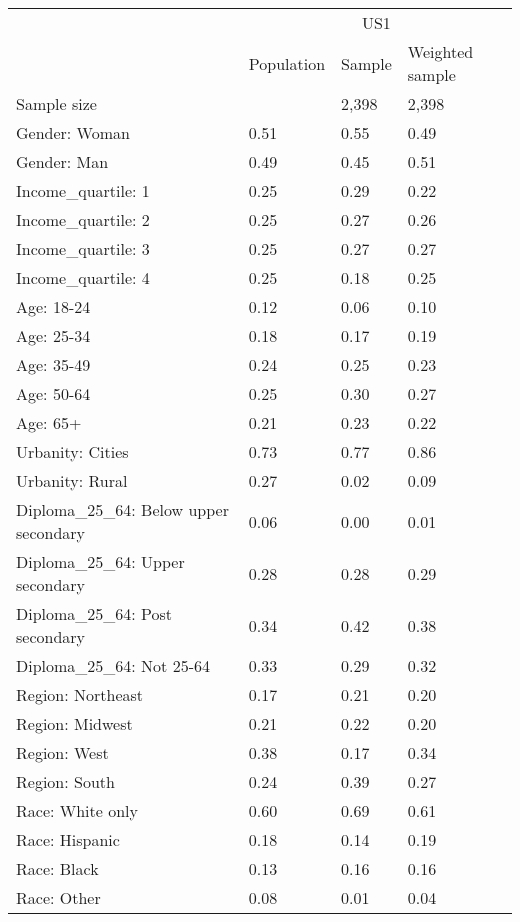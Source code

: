 
\begin{tabular}[t]{llll}
\toprule
\multicolumn{1}{c}{} & \multicolumn{3}{c}{US1} \\
\cmidrule(l{3pt}r{3pt}){2-4}
  & Population & Sample & Weighted sample\\
\midrule
Sample size &  & 2,398 & 2,398\\
\addlinespace
Gender: Woman & 0.51 & 0.55 & 0.49\\
Gender: Man & 0.49 & 0.45 & 0.51\\
\addlinespace
Income\_quartile: 1 & 0.25 & 0.29 & 0.22\\
Income\_quartile: 2 & 0.25 & 0.27 & 0.26\\
Income\_quartile: 3 & 0.25 & 0.27 & 0.27\\
Income\_quartile: 4 & 0.25 & 0.18 & 0.25\\
\addlinespace
Age: 18-24 & 0.12 & 0.06 & 0.10\\
Age: 25-34 & 0.18 & 0.17 & 0.19\\
Age: 35-49 & 0.24 & 0.25 & 0.23\\
Age: 50-64 & 0.25 & 0.30 & 0.27\\
Age: 65+ & 0.21 & 0.23 & 0.22\\
\addlinespace
Urbanity: Cities & 0.73 & 0.77 & 0.86\\
Urbanity: Rural & 0.27 & 0.02 & 0.09\\
\addlinespace
Diploma\_25\_64: Below upper secondary & 0.06 & 0.00 & 0.01\\
Diploma\_25\_64: Upper secondary & 0.28 & 0.28 & 0.29\\
Diploma\_25\_64: Post secondary & 0.34 & 0.42 & 0.38\\
Diploma\_25\_64: Not 25-64 & 0.33 & 0.29 & 0.32\\
\addlinespace
Region: Northeast & 0.17 & 0.21 & 0.20\\
Region: Midwest & 0.21 & 0.22 & 0.20\\
Region: West & 0.38 & 0.17 & 0.34\\
Region: South & 0.24 & 0.39 & 0.27\\
\addlinespace
Race: White only & 0.60 & 0.69 & 0.61\\
Race: Hispanic & 0.18 & 0.14 & 0.19\\
Race: Black & 0.13 & 0.16 & 0.16\\
Race: Other & 0.08 & 0.01 & 0.04\\
\bottomrule
\end{tabular}